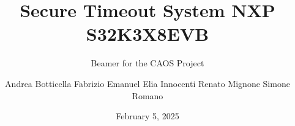 \documentclass{beamer}
\title{Secure Timeout System \newline NXP S32K3X8EVB}
\subtitle{Beamer for the CAOS Project}
\author{
    \newline Andrea Botticella
    \newline Fabrizio Emanuel 
    \newline Elia Innocenti
    \newline Renato Mignone 
    \newline Simone Romano     
}
\date{February 5, 2025}
\begin{document}
\maketitle








\title{} %
\backmatter
\end{document}
